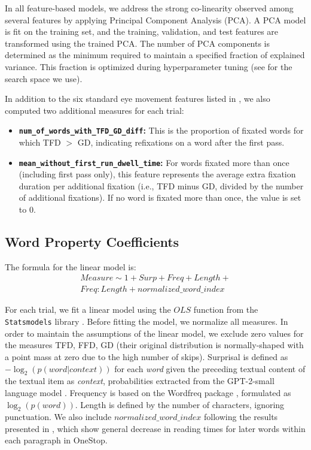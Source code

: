 In all feature-based models, we address the strong co-linearity observed among several features by applying Principal Component Analysis (PCA). A PCA model is fit on the training set, and the training, validation, and test features are transformed using the trained PCA. The number of PCA components is determined as the minimum required to maintain a specified fraction of explained variance. This fraction is optimized during hyperparameter tuning (see  for the search space we use).

In addition to the six standard eye movement features listed in , we also computed two additional measures for each trial:
\begin{itemize}
    \item \textbf{\texttt{num\_of\_words\_with\_TFD\_GD\_diff}:} This is the proportion of fixated words for which TFD $>$ GD, indicating refixations on a word after the first pass.
    
    \item \textbf{\texttt{mean\_without\_first\_run\_dwell\_time}:} For words fixated more than once (including first pass only), this feature represents the average extra fixation duration per additional fixation (i.e., TFD minus GD, divided by the number of additional fixations). If no word is fixated more than once, the value is set to 0.
\end{itemize}


\subsection{Word Property Coefficients}
\label{app:response_to_ling}
The formula for the linear model is:
\begin{equation*}
\begin{aligned}
Measure \sim 1 + Surp + Freq + Length + \\
Freq:Length + normalized\_word\_index
\end{aligned}
\end{equation*}

For each trial, we fit a linear model using the $OLS$ function from the \texttt{Statsmodels} library \cite{seabold2010statsmodels}. Before fitting the model, we normalize all measures. In order to maintain the assumptions of the linear model, we exclude zero values for the measures TFD, FFD, GD (their original distribution is normally-shaped with a point mass at zero due to the high number of skips).
Surprisal \cite{hale2001probabilistic,levy2008expectation} is defined as $-\log_2(p(word|context))$ for each \textit{word} given the preceding textual content of the 
 textual item as \textit{context}, probabilities extracted from the GPT-2-small language model \cite{radford2019language,wolf-etal-2020-transformers}. Frequency is based on the Wordfreq package \cite{robyn_speer_2022_7199437}, formulated as $\log_2(p(word))$. Length is defined by the number of characters, ignoring punctuation.
 We also include $normalized\_word\_index$ following the results presented in \cite{shubi2023}, which show general decrease in reading times for later words within each paragraph in OneStop.



